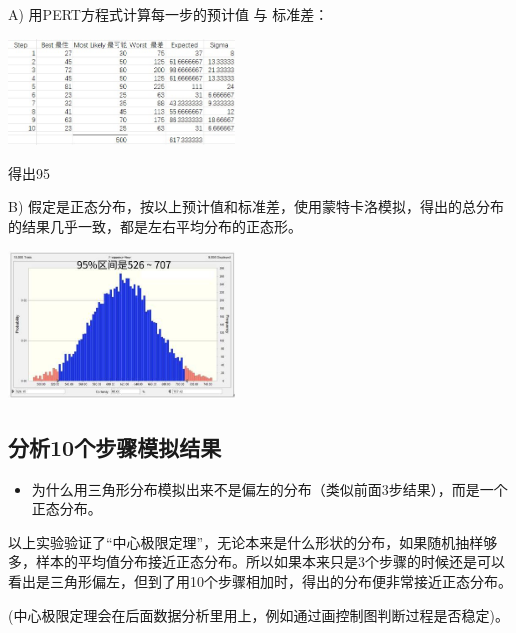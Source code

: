 A) 用PERT方程式计算每一步的预计值 与 标准差：


\includegraphics[width=6cm]{10stepsPertScreenshot_2022-10-24_205007.jpg}

得出95%

B) 假定是正态分布，按以上预计值和标准差，使用蒙特卡洛模拟，得出的总分布的结果几乎一致，都是左右平均分布的正态形。

\includegraphics[width=6cm]{微信图片_20240117093606.jpg}

\hypertarget{ux5206ux679010ux6b65ux9aa4ux6a21ux62dfux7ed3ux679c}{%
\subsection{分析10个步骤模拟结果}\label{ux5206ux679010ux6b65ux9aa4ux6a21ux62dfux7ed3ux679c}}

\begin{itemize}
\tightlist
\item
  为什么用三角形分布模拟出来不是偏左的分布（类似前面3步结果），而是一个正态分布。
\end{itemize}

\begin{description}
\tightlist
\item[]
以上实验验证了“中心极限定理”，无论本来是什么形状的分布，如果随机抽样够多，样本的平均值分布接近正态分布。所以如果本来只是3个步骤的时候还是可以看出是三角形偏左，但到了用10个步骤相加时，得出的分布便非常接近正态分布。

(中心极限定理会在后面数据分析里用上，例如通过画控制图判断过程是否稳定)。\\
\end{description}

